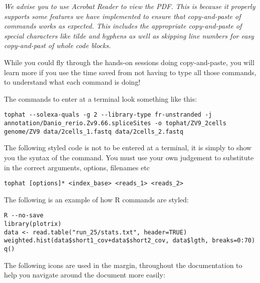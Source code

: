 \emph{We advise you to use Acrobat Reader to view the PDF. This is because it properly supports some
features we have implemented to ensure that copy-and-paste of commands works as expected. This
includes the appropriate copy-and-paste of special characters like tilde and hyphens as well as
skipping line numbers for easy copy-and-past of whole code blocks.}

\begin{warning}
While you could fly through the hands-on sessions doing copy-and-paste, you will learn more if you
use the time saved from not having to type all those commands, to understand what each command is
doing!
\end{warning}

The commands to enter at a terminal look something like this:
\begin{lstlisting}
tophat --solexa-quals -g 2 --library-type fr-unstranded -j annotation/Danio_rerio.Zv9.66.spliceSites -o tophat/ZV9_2cells genome/ZV9 data/2cells_1.fastq data/2cells_2.fastq
\end{lstlisting}  

The following styled code is not to be entered at a terminal, it is simply to show you the syntax of
the command. You must use your own judgement to substitute in the correct arguments, options,
filenames etc

\begin{lstlisting}[style=command_syntax]
tophat [options]* <index_base> <reads_1> <reads_2>
\end{lstlisting}

The following is an example of how R commands are styled:

\begin{lstlisting}[style=R]
R --no-save
library(plotrix) 
data <- read.table("run_25/stats.txt", header=TRUE) 
weighted.hist(data$short1_cov+data$short2_cov, data$lgth, breaks=0:70)
q()
\end{lstlisting}

The following icons are used in the margin, throughout the documentation to help you navigate around
the document more easily:

